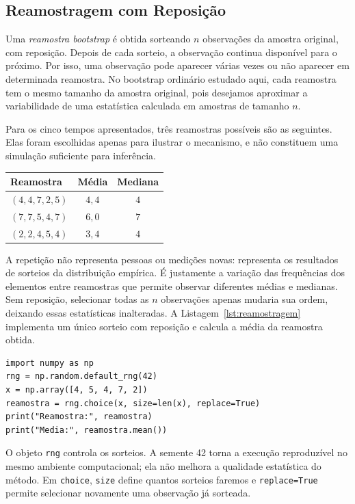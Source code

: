 \documentclass[12pt,a4paper]{article}
\begin{document}
\subsection{Reamostragem com Reposição}
\label{subsec:reamostragem}
Uma \emph{reamostra bootstrap} é obtida sorteando $n$ observações da amostra original, com reposição. Depois de cada sorteio, a observação continua disponível para o próximo. Por isso, uma observação pode aparecer várias vezes ou não aparecer em determinada reamostra. No bootstrap ordinário estudado aqui, cada reamostra tem o mesmo tamanho da amostra original, pois desejamos aproximar a variabilidade de uma estatística calculada em amostras de tamanho $n$.

Para os cinco tempos apresentados, três reamostras possíveis são as seguintes. Elas foram escolhidas apenas para ilustrar o mecanismo, e não constituem uma simulação suficiente para inferência.
\begin{center}
\renewcommand{\arraystretch}{1.3}
\begin{tabular}{lcc}
\toprule
\textbf{Reamostra} & \textbf{Média} & \textbf{Mediana}\\
\midrule
$(4,4,7,2,5)$ & $4{,}4$ & $4$\\
$(7,7,5,4,7)$ & $6{,}0$ & $7$\\
$(2,2,4,5,4)$ & $3{,}4$ & $4$\\
\bottomrule
\end{tabular}
\end{center}
A repetição não representa pessoas ou medições novas: representa os resultados de sorteios da distribuição empírica. É justamente a variação das frequências dos elementos entre reamostras que permite observar diferentes médias e medianas. Sem reposição, selecionar todas as $n$ observações apenas mudaria sua ordem, deixando essas estatísticas inalteradas. A Listagem~\ref{lst:reamostragem} implementa um único sorteio com reposição e calcula a média da reamostra obtida.

\begin{lstlisting}[caption={Uma reamostra com reposição.},label={lst:reamostragem}]
import numpy as np
rng = np.random.default_rng(42)
x = np.array([4, 5, 4, 7, 2])
reamostra = rng.choice(x, size=len(x), replace=True)
print("Reamostra:", reamostra)
print("Media:", reamostra.mean())
\end{lstlisting}
O objeto \texttt{rng} controla os sorteios. A semente 42 torna a execução reproduzível no mesmo ambiente computacional; ela não melhora a qualidade estatística do método. Em \texttt{choice}, \texttt{size} define quantos sorteios faremos e \texttt{replace=True} permite selecionar novamente uma observação já sorteada.
\end{document}
